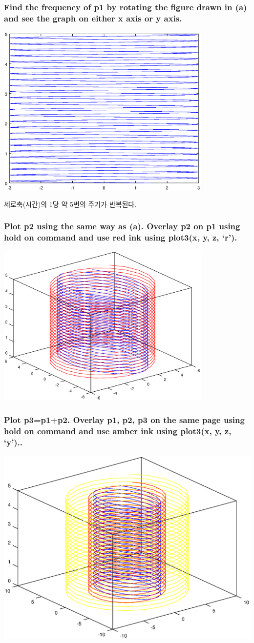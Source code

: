 \documentclass[12pt,a4paper]{article}
\begin{document}
\subsubsection{Find the frequency of p1 by rotating the figure drawn in (a) and see the graph on either x axis or y axis.}
\includegraphics[width=0.8\textwidth]{3b.eps}

세로축(시간)의 1당 약 5번의 주기가 반복된다.
\subsubsection{Plot p2 using the same way as (a).  Overlay p2 on p1 using hold on command and use red ink using plot3(x, y, z, ‘r’).}
\includegraphics[width=0.8\textwidth]{3c.eps}
\subsubsection{Plot p3=p1+p2.  Overlay p1, p2, p3 on the same page using hold on command and use amber ink using plot3(x, y, z, ‘y’)..} 
\includegraphics[width=\textwidth]{3d.eps}
\end{document}
